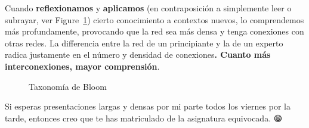 \documentclass[
  letterpaper,
  DIV=11,
  numbers=noendperiod]{scrartcl}
\begin{document}
\begin{tcolorbox}[enhanced jigsaw, left=2mm, colframe=quarto-callout-tip-color-frame, toprule=.15mm, rightrule=.15mm, toptitle=1mm, bottomtitle=1mm, breakable, opacityback=0, title=\textcolor{quarto-callout-tip-color}{\faLightbulb}\hspace{0.5em}{Pirámide Bloom}, bottomrule=.15mm, coltitle=black, colback=white, titlerule=0mm, arc=.35mm, leftrule=.75mm, opacitybacktitle=0.6, colbacktitle=quarto-callout-tip-color!10!white]

Cuando \textbf{reflexionamos} y \textbf{aplicamos} (en contraposición a
simplemente leer o subrayar, ver Figure~\ref{fig-bloom}) cierto
conocimiento a contextos nuevos, lo comprendemos más profundamente,
provocando que la red sea más densa y tenga conexiones con otras redes.
La differencia entre la red de un principiante y la de un experto radica
justamente en el número y densidad de conexiones\textbf{. Cuanto más
interconexiones, mayor comprensión}.

\begin{figure}[H]


\caption{\label{fig-bloom}Taxonomía de Bloom}

\end{figure}%

\end{tcolorbox}

Si esperas presentaciones largas y densas por mi parte todos los viernes
por la tarde, entonces creo que te has matriculado de la asignatura
equivocada. 😁🍻
\end{document}
